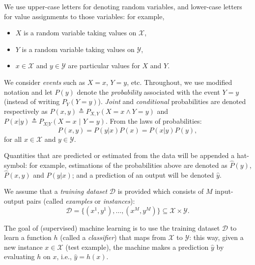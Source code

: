 We use upper-case letters for denoting random variables, and lower-case letters for value assignments to those variables:  
for example, 
\begin{itemize}
\item $X$ is a random variable taking values on $\mathcal{X}$,
\item $Y$ is a random variable taking values on $\mathcal{Y}$,
\item $x \in \mathcal{X}$ and $y \in \mathcal{Y}$ are particular values for $X$ and $Y$. 
\end{itemize}  
We consider \emph{events} such as $X=x$, $Y=y$, etc. 
Throughout, we use modified notation and let $P(y)$ denote the \emph{probability} associated with the event $Y=y$ (instead of writing $P_Y(Y=y)$). 
\emph{Joint} and \emph{conditional} probabilities are 
denoted respectively as $P(x,y) \triangleq P_{X,Y}(X=x \wedge Y=y)$ and $P(x|y) \triangleq P_{X|Y}(X=x \,\,|\,\,Y=y)$. From the laws of probabilities: 
\begin{equation}
P(x,y)=P(y|x) P(x) = P(x|y) P(y), 
\end{equation}
for all $x \in \mathcal{X}$ and $y \in \mathcal{Y}$.

Quantities that are predicted or estimated from the data will be appended a hat-symbol: for example, estimations of the probabilities above are denoted 
as ${\hat P}(y)$, ${\hat P}(x,y)$ and ${\hat P}(y|x)$; and a prediction of an output will be denoted ${\hat y}$. 

We assume that a \emph{training dataset} $\mathcal{D}$ is provided
which consists of $M$ input-output pairs (called \emph{examples} or
\emph{instances}): 
\begin{equation}
\mathcal{D} = \{(x^{1},y^{1}),\ldots,(x^{M},y^{M})\} \subseteq \mathcal{X} \times \mathcal{Y}.  
\end{equation}

The goal of (supervised) machine learning is to use the training dataset $\mathcal{D}$ to learn a function $h$ (called a \emph{classifier}) 
that maps from $\mathcal{X}$ to $\mathcal{Y}$: this way, given a new instance 
$x \in \mathcal{X}$ (test example), the machine makes a prediction ${\hat y}$ by evaluating $h$ on $x$, i.e., ${\hat y} = h(x)$. 

